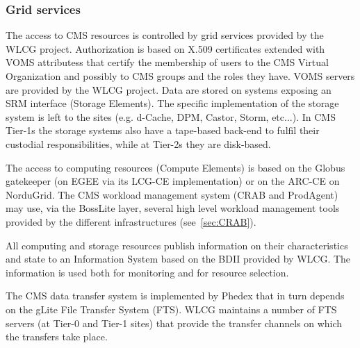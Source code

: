 \subsubsection{ Grid services }
\label{sec:4_1_1}

The access to CMS resources is controlled by grid services provided by the WLCG project.
Authorization is based on X.509 certificates extended with VOMS attributess
that certify the membership of users
to the CMS Virtual Organization and possibly to CMS groups and the roles they have.
VOMS servers are provided by the WLCG project.
Data are stored on systems exposing an SRM interface (Storage Elements).
The specific implementation of the storage system is left to the sites
(e.g. d-Cache, DPM, Castor, Storm, etc...). In CMS Tier-1s the storage
systems also have a tape-based back-end to fulfil their custodial
responsibilities, while at Tier-2s they are disk-based.

The access to computing resources (Compute Elements) is based on
the Globus gatekeeper (on EGEE via its LCG-CE implementation) or on the ARC-CE on NorduGrid.
The CMS workload management system (CRAB and ProdAgent) may use, via the BossLite layer,
several high level workload management tools provided by the different infrastructures
(see~\ref{sec:CRAB}).


All computing and storage resources publish information on their
characteristics and state to an Information System based
on the BDII provided by WLCG. The information is used both
for monitoring and for resource selection.

The CMS data transfer system is implemented by Phedex that
in turn depends on the gLite File Transfer System (FTS).
WLCG maintains a number of FTS servers (at Tier-0 and Tier-1 sites)
that provide the transfer channels on which the transfers take place.


